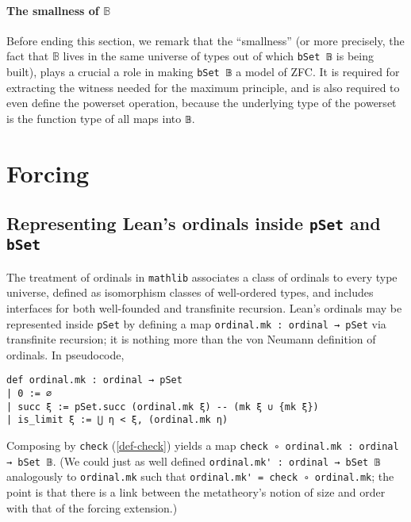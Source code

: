\documentclass[a4paper,USenglish,cleveref, autoref]{lipics-v2019}
\newcommand{\B}{\mathbb{B}}
\newcommand{\lil}{\lstinline}
\begin{document}
\paragraph*{The smallness of $\B$}
Before ending this section, we remark that the ``smallness'' (or more precisely, the fact that $\B$ lives in the same universe of types out of which \lil{bSet 𝔹} is being built), plays a crucial a role in making \lstinline{bSet 𝔹} a model of ZFC. It is required for extracting the witness needed for the maximum principle, and is also required to even define the powerset operation, because the underlying type of the powerset is the function type of all maps into \lstinline{𝔹}.

\section{Forcing}
\label{sect:forcing}

\subsection{Representing Lean's ordinals inside \lil{pSet} and \lil{bSet}}
The treatment of ordinals in \lil{mathlib} associates a class of ordinals to every type universe, defined as isomorphism classes of well-ordered types, and includes interfaces for both well-founded and transfinite recursion. Lean's ordinals may be represented inside \lil{pSet} by defining a map \lil{ordinal.mk : ordinal → pSet} via transfinite recursion; it is nothing more than the von Neumann definition of ordinals. In pseudocode,
\begin{lstlisting}
def ordinal.mk : ordinal → pSet
| 0 := ∅
| succ ξ := pSet.succ (ordinal.mk ξ) -- (mk ξ ∪ {mk ξ})
| is_limit ξ := ⋃ η < ξ, (ordinal.mk η)
\end{lstlisting}
Composing by \lil{check} (\autoref{def-check}) yields a map \lil{check ∘ ordinal.mk : ordinal → bSet 𝔹}. (We could just as well defined \lstinline{ordinal.mk' : ordinal → bSet 𝔹} analogously to \lstinline{ordinal.mk} such that \lstinline{ordinal.mk' = check ∘ ordinal.mk}; the point is that there is a link between the metatheory's notion of size and order with that of the forcing extension.)
\end{document}
